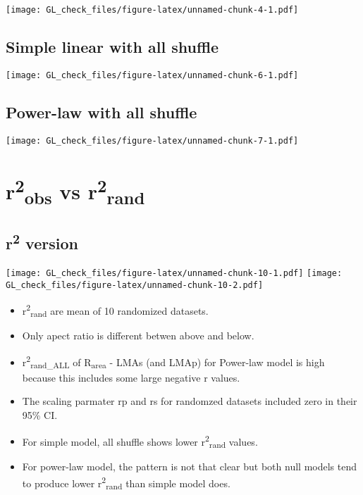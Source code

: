 \documentclass[12pt,]{article}
\providecommand{\tightlist}{%
  \setlength{\itemsep}{0pt}\setlength{\parskip}{0pt}}
\theoremstyle{definition}
\theoremstyle{definition}
\theoremstyle{remark}
\begin{document}
\texttt{[image: GL\_check\_files/figure-latex/unnamed-chunk-4-1.pdf]}

\subsection{Simple linear with all
shuffle}\label{simple-linear-with-all-shuffle}

\texttt{[image: GL\_check\_files/figure-latex/unnamed-chunk-6-1.pdf]}

\subsection{Power-law with all
shuffle}\label{power-law-with-all-shuffle}

\texttt{[image: GL\_check\_files/figure-latex/unnamed-chunk-7-1.pdf]}

\section{\texorpdfstring{r\textsuperscript{2}\textsubscript{obs} vs
r\textsuperscript{2}\textsubscript{rand}}{r2obs vs r2rand}}\label{r2obs-vs-r2rand}

\subsection{\texorpdfstring{r\textsuperscript{2}
version}{r2 version}}\label{r2-version}

\texttt{[image: GL\_check\_files/figure-latex/unnamed-chunk-10-1.pdf]}
\texttt{[image: GL\_check\_files/figure-latex/unnamed-chunk-10-2.pdf]}

\begin{itemize}
\tightlist
\item
  r\textsuperscript{2}\textsubscript{rand} are mean of 10 randomized
  datasets.
\item
  Only apect ratio is different betwen above and below.
\item
  r\textsuperscript{2}\textsubscript{rand\_ALL} of R\textsubscript{area}
  - LMAs (and LMAp) for Power-law model is high because this includes
  some large negative r values.
\item
  The scaling parmater rp and rs for randomzed datasets included zero in
  their 95\% CI.
\item
  For simple model, all shuffle shows lower
  r\textsuperscript{2}\textsubscript{rand} values.
\item
  For power-law model, the pattern is not that clear but both null
  models tend to produce lower r\textsuperscript{2}\textsubscript{rand}
  than simple model does.
\end{itemize}
\end{document}
